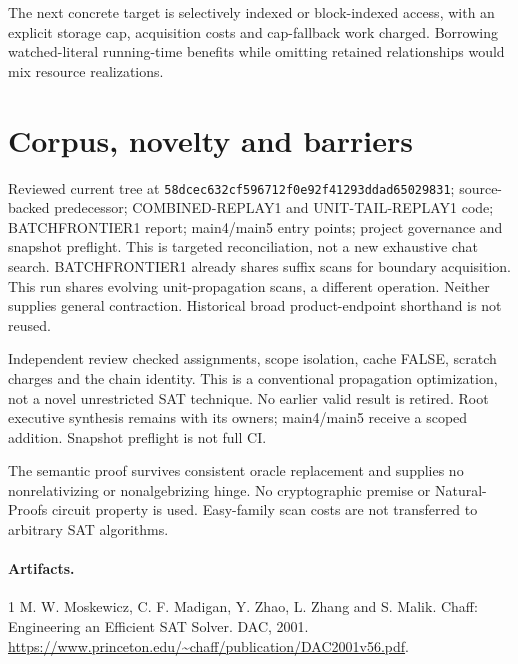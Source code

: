 \documentclass[11pt]{article}
\begin{document}
The next concrete target is selectively indexed or block-indexed access,
with an explicit storage cap, acquisition costs and cap-fallback work
charged. Borrowing watched-literal running-time benefits while omitting
retained relationships would mix resource realizations.

\section{Corpus, novelty and barriers}
Reviewed current tree at
\texttt{58dcec632cf596712f0e92f41293ddad65029831};
source-backed predecessor; COMBINED-REPLAY1 and UNIT-TAIL-REPLAY1 code;
BATCHFRONTIER1 report; main4/main5 entry points; project governance and
snapshot preflight. This is targeted reconciliation, not a new exhaustive
chat search. BATCHFRONTIER1 already shares suffix scans for boundary
acquisition. This run shares evolving unit-propagation scans, a different
operation. Neither supplies general contraction. Historical broad
product-endpoint shorthand is not reused.

Independent review checked assignments, scope isolation, cache FALSE,
scratch charges and the chain identity. This is a conventional propagation
optimization, not a novel unrestricted SAT technique. No earlier valid
result is retired. Root executive synthesis remains with its owners;
main4/main5 receive a scoped addition. Snapshot preflight is not full CI.

The semantic proof survives consistent oracle replacement and supplies
no nonrelativizing or nonalgebrizing hinge. No cryptographic premise or
Natural-Proofs circuit property is used. Easy-family scan costs are not
transferred to arbitrary SAT algorithms.

\paragraph{Artifacts.}
\begin{description}
\item[] 
\item[] 
\item[] 
\item[] 
\end{description}
\begin{thebibliography}{1}
 M. W. Moskewicz, C. F. Madigan, Y. Zhao,
L. Zhang and S. Malik.
Chaff: Engineering an Efficient SAT Solver. DAC, 2001.
\url{https://www.princeton.edu/~chaff/publication/DAC2001v56.pdf}.
\end{thebibliography}
\end{document}

